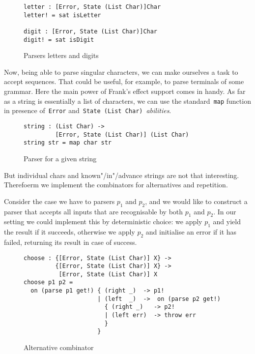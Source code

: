     \begin{figure}[h]
    \begin{lstlisting}
letter : [Error, State (List Char)]Char
letter! = sat isLetter

digit : [Error, State (List Char)]Char
digit! = sat isDigit
    \end{lstlisting}
    \caption{Parsers letters and digits}
    \label{listing:parserLetterCombo}
    \end{figure}

    Now, being able to parse singular characters, we can make ourselves a task
    to accept sequences. That could be useful, for example, to parse terminals of
    some grammar. Here the main power of Frank's effect support comes in handy.
    As far as a string is essentially a list of characters, we can use the
    standard~\texttt{map} function in presence of~\texttt{Error}
    and~\texttt{State (List Char)}~\emph{abilities}.

    \begin{figure}[h]
    \begin{lstlisting}
string : (List Char) ->
         [Error, State (List Char)] (List Char)
string str = map char str
    \end{lstlisting}
    \caption{Parser for a given string}
    \label{listing:parserStrCombo}
    \end{figure}

    But individual chars and known"/in"/advance strings are not that interesting.
    Therefoerm we implement the combinators for alternatives and repetition.

    Consider the case we have to parsers $p_1$ and $p_2$, and we would like to
    construct a parser that accepts all inputs that are recognisable by both
    $p_1$ and $p_2$. In our setting we could implement this by deterministic
    choice: we apply $p_1$ and yield the result if it succeeds, otherwise we
    apply $p_2$ and initialise an error if it has failed, returning its
    result in case of success.

    \begin{figure}[h]
    \begin{lstlisting}
choose : {[Error, State (List Char)] X} ->
         {[Error, State (List Char)] X} ->
          [Error, State (List Char)] X
choose p1 p2 =
  on (parse p1 get!) { (right _)  -> p1!
                     | (left  _)  ->  on (parse p2 get!)
                       { (right _)   -> p2!
                       | (left err)  -> throw err
                       }
                     }
    \end{lstlisting}
    \caption{Alternative combinator}
    \label{listing:parserChooseCombo}
    \end{figure}

